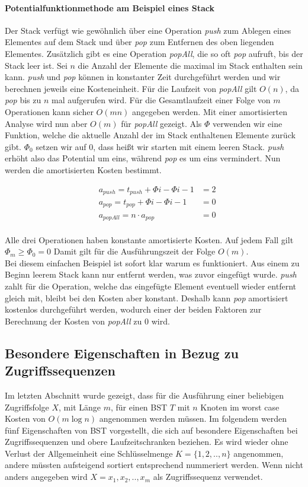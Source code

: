 \documentclass[a4paper,12pt]{article}
\begin{document}
\paragraph{Potentialfunktionmethode am Beispiel eines Stack} 
Der Stack verfügt wie gewöhnlich über eine Operation \textit{push} zum Ablegen eines Elementes auf dem Stack und über \textit{pop} zum Entfernen des oben liegenden Elementes. Zusätzlich gibt es eine Operation \textit{popAll}, die so oft \textit{pop} aufruft, bis der Stack leer ist. Sei $n$ die Anzahl der Elemente die maximal im Stack enthalten sein kann. \textit{push} und \textit{pop} können in konstanter Zeit durchgeführt werden und wir berechnen jeweils eine Kosteneinheit. Für die Laufzeit von \textit{popAll} gilt $O(n)$, da \textit{pop} bis zu $n$ mal aufgerufen wird. Für die Gesamtlaufzeit einer Folge von $m$ Operationen kann sicher $O(mn)$ angegeben werden. Mit einer amortisierten Analyse wird nun aber $O(m)$ für \textit{popAll} gezeigt. Als $\Phi$ verwenden wir eine Funktion, welche die aktuelle Anzahl der im Stack enthaltenen Elemente zurück gibt. $\Phi_0$ setzen wir auf $0$, dass heißt wir starten mit einem leeren Stack. \textit{push} erhöht also das Potential um eins, während \textit{pop} es um eins vermindert. Nun werden die amortisierten Kosten bestimmt. 

\begin{align*}   
&a_{\mathit{push}} = t_{\mathit{push}} + \Phi{i} - \Phi{i-1}  &= 2\\
&a_{\mathit{pop}} = t_{\mathit{pop}} + \Phi{i} - \Phi{i-1}  &= 0\\
&a_{\mathit{popAll}} = n \cdot a_{\mathit{pop}} &= 0
\end{align*}\\
Alle drei Operationen haben konstante amortisierte Kosten. Auf jedem Fall gilt $ \Phi_m \geq  \Phi_0 = 0 $ Damit gilt für die Ausführungszeit der Folge $O(m)$. \\
Bei diesem einfachen Beispiel ist sofort klar warum es funktioniert. Aus einem zu Beginn leerem Stack kann nur entfernt werden, was zuvor eingefügt wurde. \textit{push} zahlt für die Operation, welche das eingefügte Element eventuell wieder entfernt gleich mit, bleibt bei den Kosten aber konstant. Deshalb kann \textit{pop} amortisiert kostenlos durchgeführt werden, wodurch einer der beiden Faktoren zur Berechnung der Kosten von \textit{popAll} zu $0$ wird.  
\subsection{Besondere Eigenschaften in Bezug zu Zugriffssequenzen }
Im letzten Abschnitt wurde gezeigt, dass für die Ausführung einer beliebigen Zugriffsfolge $X$, mit Länge $m$, für einen BST $T$ mit $n$ Knoten im worst case Kosten von  $O\left(m \log n\right)$ angenommen werden müssen.  Im folgendem werden fünf Eigenschaften von BST vorgestellt, die sich auf besondere Eigenschaften bei Zugriffssequenzen und obere Laufzeitschranken beziehen. Es wird wieder ohne Verlust der Allgemeinheit eine Schlüsselmenge $K = \{1,2,..,n\}$ angenommen, andere müssten aufsteigend sortiert entsprechend nummeriert werden. Wenn nicht anders angegeben wird  $X = x_1,x_2,..,x_m$ als Zugriffssequenz verwendet.
\end{document}
